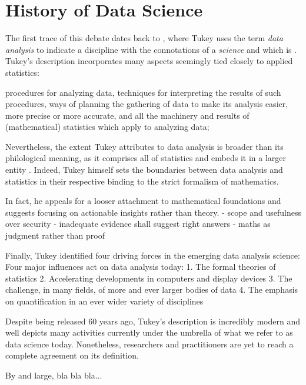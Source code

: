 \section{History of Data Science}
\label{chap:historyDS}

The first trace of this debate dates back to \cite{tukey1962future}, where Tukey uses the term \emph{data analysis} to indicate a discipline with the connotations of a \emph{science} and which is . 
Tukey's description incorporates many aspects seemingly tied closely to applied statistics: 
\begin{displayquote}
procedures for analyzing data, techniques for interpreting the results of such procedures, ways of planning the gathering of data to make its analysis easier, more precise or more accurate, and all the machinery and results of (mathematical) statistics which apply to analyzing data;
\end{displayquote}
Nevertheless, the extent Tukey attributes to data analysis is broader than its philological meaning, as it comprises all of statistics and embeds it in a larger entity \cite{huber2012data, donoho201750years}.
Indeed, Tukey himself sets the boundaries between data analysis and statistics in their respective binding to the strict formalism of mathematics.

In fact, he appeals for a looser attachment to mathematical foundations and suggests focusing on actionable insights rather than theory.
 - scope and usefulness over security
 - inadequate evidence shall suggest right answers
 - maths as judgment rather than proof
 
Finally, Tukey identified four driving forces in the emerging data analysis science:
Four major influences act on data analysis today:
1. The formal theories of statistics
2. Accelerating developments in computers and display devices
3. The challenge, in many fields, of more and ever larger bodies of data
4. The emphasis on quantification in an ever wider variety of disciplines

Despite being released 60 years ago, Tukey's description is incredibly modern and well depicts many activities currently under the umbrella of what we refer to as data science today.
Nonetheless, researchers and practitioners are yet to reach a complete agreement on its definition.

By and large, bla bla bla...